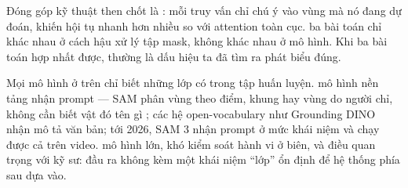 \documentclass[../../../deep_learning.tex]{subfiles}
\begin{document}
\begin{mach}
Đóng góp kỹ thuật then chốt là : mỗi truy vấn chỉ chú ý vào vùng mà nó đang dự đoán, khiến hội tụ nhanh hơn nhiều so với attention toàn cục. \hq ba bài toán chỉ khác nhau ở cách hậu xử lý tập mask, không khác nhau ở mô hình. Khi ba bài toán hợp nhất được, thường là dấu hiệu ta đã tìm ra phát biểu đúng.
\item {} Mọi mô hình ở trên chỉ biết những lớp có trong tập huấn luyện. \gp mô hình nền tảng nhận prompt --- SAM phân vùng theo điểm, khung hay vùng do người chỉ, không cần biết vật đó tên gì \cite{kirillov2023sam}; các hệ open-vocabulary như Grounding DINO nhận mô tả văn bản; tới 2026, SAM 3 nhận prompt ở mức khái niệm và chạy được cả trên video. \gia mô hình lớn, khó kiểm soát hành vi ở biên, và điều quan trọng với kỹ sư: đầu ra không kèm một khái niệm ``lớp'' ổn định để hệ thống phía sau dựa vào.
\end{mach}
\end{document}
